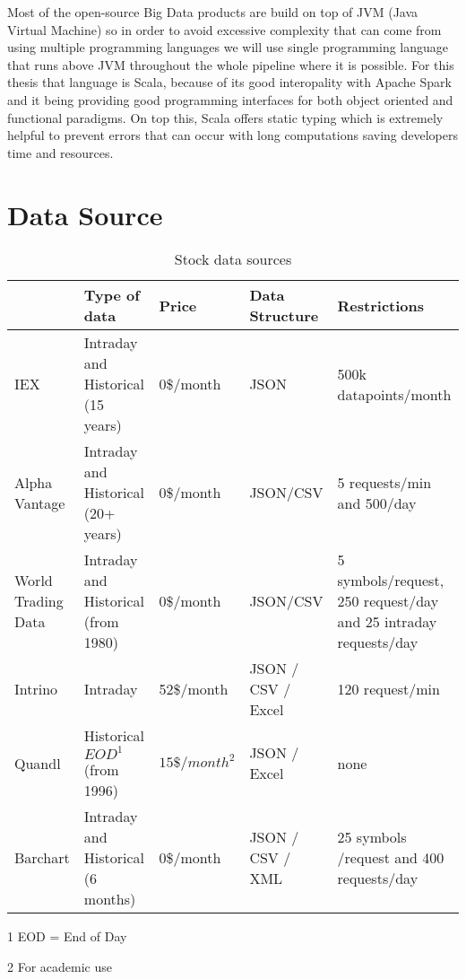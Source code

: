 Most of the open-source Big Data products are build on top of JVM (Java Virtual Machine) so in order to avoid excessive complexity that can come from using multiple programming languages we will use single programming language that runs above JVM throughout the whole pipeline where it is possible.
For this thesis that language is Scala, because of its good interopality with Apache Spark and it being providing good programming interfaces for both object oriented and functional paradigms.
On top this, Scala offers static typing which is extremely helpful to prevent errors that can occur with long computations saving developers time and resources. \cite{scalabook}

\section{Data Source}

\begin{table}[! htbp]\centering 
    \caption{Stock data sources}
    \begin{threeparttable}
        \begin{tabular}{|p{2cm}|p{2.5cm}|l|p{2cm}|p{3cm}|} 
        \hline
        & Type of data & Price & Data Structure & Restrictions \\ \hline
        IEX \cite{iex}& Intraday and Historical (15 years) & 0\$/month & JSON & 500k datapoints/month \\ \hline
        Alpha Vantage \cite{alphavantage}  & Intraday and Historical (20+ years)& 0\$/month & JSON/CSV & 5 requests/min and 500/day\\ \hline
        World Trading Data \cite{worldtradingdata} & Intraday and Historical (from 1980) & 0\$/month & JSON/CSV & 5 symbols/request, 250 request/day and 25 intraday requests/day\\ \hline
        Intrino \cite{intrino} & Intraday & 52\$/month & JSON / CSV / Excel & 120 request/min\\ \hline
        Quandl \cite{quandl} & Historical $EOD^1$ (from 1996) & $15\$/month^2$ & JSON / Excel & none\\ \hline
        Barchart \cite{barchart} & Intraday and Historical (6 months) & 0\$/month & JSON / CSV / XML & 25 symbols /request and 400 requests/day\\
        \hline
        \end{tabular}
        \begin{tablenotes}\footnotesize
            \item[1] EOD = End of Day
            \item[2] For academic use 
        \end{tablenotes}
    \end{threeparttable}        
\end{table}

